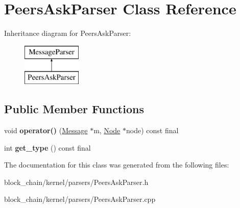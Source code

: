 \hypertarget{classPeersAskParser}{}\section{Peers\+Ask\+Parser Class Reference}
\label{classPeersAskParser}
Inheritance diagram for Peers\+Ask\+Parser\+:\begin{figure}[H]
\begin{center}
\leavevmode
\includegraphics[height=2.000000cm]{classPeersAskParser}
\end{center}
\end{figure}
\subsection*{Public Member Functions}
\begin{DoxyCompactItemize}
\item 
\mbox{\label{classPeersAskParser_ac52c9f42fa449029d49faaf9255b2d0d}} 
void {\bfseries operator()} (\mbox{\hyperlink{classMessage}{Message}} $\ast$m, \mbox{\hyperlink{classNode}{Node}} $\ast$node) const final
\item 
\mbox{\label{classPeersAskParser_abda1a00fdca208592d3f7e7b039f9ba7}} 
int {\bfseries get\+\_\+type} () const final
\end{DoxyCompactItemize}


The documentation for this class was generated from the following files\+:\begin{DoxyCompactItemize}
\item 
block\+\_\+chain/kernel/parsers/Peers\+Ask\+Parser.\+h\item 
block\+\_\+chain/kernel/parsers/Peers\+Ask\+Parser.\+cpp\end{DoxyCompactItemize}
